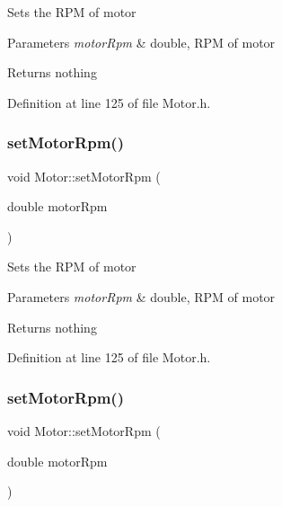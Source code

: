 Sets the R\+PM of motor


\begin{DoxyParams}{Parameters}
{\em motor\+Rpm} & double, R\+PM of motor\\
\hline
\end{DoxyParams}
\begin{DoxyReturn}{Returns}
nothing 
\end{DoxyReturn}


Definition at line 125 of file Motor.\+h.

\mbox{\label{class_motor_ac0fda674bd40e24bb864e8256fb5ba32}} 
\subsubsection{\texorpdfstring{set\+Motor\+Rpm()}{setMotorRpm()}\hspace{0.1cm}{\footnotesize\ttfamily [2/3]}}
{\footnotesize\ttfamily void Motor\+::set\+Motor\+Rpm (\begin{DoxyParamCaption}\item[{double}]{motor\+Rpm }\end{DoxyParamCaption})\hspace{0.3cm}{\ttfamily [inline]}}

Sets the R\+PM of motor


\begin{DoxyParams}{Parameters}
{\em motor\+Rpm} & double, R\+PM of motor\\
\hline
\end{DoxyParams}
\begin{DoxyReturn}{Returns}
nothing 
\end{DoxyReturn}


Definition at line 125 of file Motor.\+h.

\mbox{\label{class_motor_ac0fda674bd40e24bb864e8256fb5ba32}} 
\subsubsection{\texorpdfstring{set\+Motor\+Rpm()}{setMotorRpm()}\hspace{0.1cm}{\footnotesize\ttfamily [3/3]}}
{\footnotesize\ttfamily void Motor\+::set\+Motor\+Rpm (\begin{DoxyParamCaption}\item[{double}]{motor\+Rpm }\end{DoxyParamCaption})\hspace{0.3cm}{\ttfamily [inline]}}

